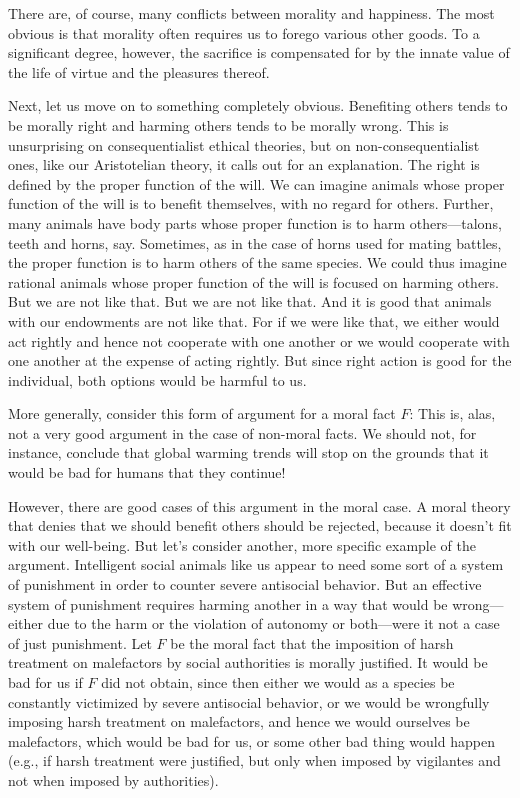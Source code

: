 There are, of course, many conflicts between morality and happiness. The most obvious is that morality often requires
us to forego various other goods. To a significant degree, however, the sacrifice is compensated for by the innate value
of the life of virtue and the pleasures thereof. 

Next, let us move on to something completely obvious. Benefiting others tends to be morally right and harming others tends to be morally
wrong. This is unsurprising on consequentialist ethical theories, but on non-consequentialist ones, like our 
Aristotelian theory, it calls out for an explanation. The right is defined by the proper function of the will.
We can imagine animals whose proper function of the will is to benefit themselves, with no regard for others. 
Further, many animals have body parts whose proper function is to harm others---talons, teeth and horns, say. Sometimes,
as in the case of horns used for mating battles, the proper function is to harm others of the same species.
We could thus imagine rational animals whose proper function of the will is focused on harming others. But 
we are not like that. But we are not like that. And it is good that animals with our endowments are not like
that. For if we were like that, we either would act rightly and hence not cooperate with one another or we 
would cooperate with one another at the expense of acting rightly. But since right action is good for the individual,
both options would be harmful to us.

More generally, consider this form of argument for a moral fact $F$:
This is, alas, not a very good argument in the case of non-moral facts. We should not, for instance, conclude
that global warming trends will stop on the grounds that it would be bad for humans that they continue! 

However, there are good cases of this argument in the moral case. A moral theory that denies that we should
benefit others should be rejected, because it doesn't fit with our well-being. But let's consider another,
more specific example of the argument. Intelligent social 
animals like us appear to need some sort of a system of punishment in order to counter severe antisocial behavior. But an effective system 
of punishment requires harming another in a way that would be wrong---either due to the harm or the violation
of autonomy or both---were it not a case of just punishment. Let $F$ be the moral fact that the imposition of
harsh treatment on malefactors by social authorities is morally justified. It would be bad for us if $F$ did not
obtain, since then either we would as a species be constantly victimized by 
severe antisocial behavior, or we would be wrongfully imposing harsh treatment on malefactors, and hence
we would ourselves be malefactors, which would be bad for us, or some other bad thing would happen (e.g., if
harsh treatment were justified, but only when imposed by vigilantes and not when imposed by authorities). 

